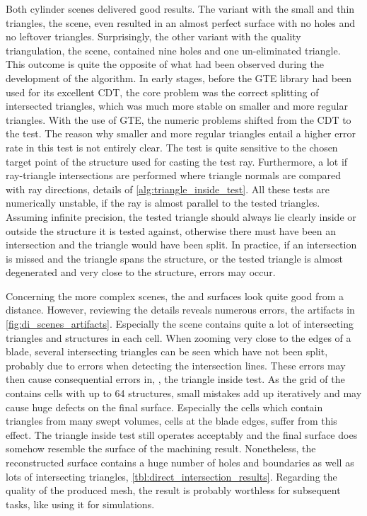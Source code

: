 Both cylinder scenes delivered good results.
The variant with the small and thin triangles, \ie the \cylinders scene, even resulted in an almost perfect surface with no holes and no leftover triangles.
Surprisingly, the other variant with the quality triangulation, \ie the \cylindersd scene, contained nine holes and one un-eliminated triangle.
This outcome is quite the opposite of what had been observed during the development of the algorithm.
In early stages, before the GTE library had been used for its excellent CDT, the core problem was the correct splitting of intersected triangles, which was much more stable on smaller and more regular triangles.
With the use of GTE, the numeric problems shifted from the CDT to the  test.
The reason why smaller and more regular triangles entail a higher error rate in this test is not entirely clear.
The test is quite sensitive to the chosen target point of the structure used for casting the test ray.
Furthermore, a lot if ray-triangle intersections are performed where triangle normals are compared with ray directions, \cf details of \cref{alg:triangle_inside_test}.
All these tests are numerically unstable, if the ray is almost parallel to the tested triangles.
Assuming infinite precision, the tested triangle should always lie clearly inside or outside the structure it is tested against, otherwise there must have been an intersection and the triangle would have been split.
In practice, if an intersection is missed and the triangle spans the structure, or the tested triangle is almost degenerated and very close to the structure, errors may occur.

Concerning the more complex scenes, the \impeller and \turbine surfaces look quite good from a distance.
However, reviewing the details reveals numerous errors, \cf the artifacts in \cref{fig:di_scenes_artifacts}.
Especially the \impeller scene contains quite a lot of intersecting triangles and structures in each cell.
When zooming very close to the edges of a blade, several intersecting triangles can be seen which have not been split, probably due to errors when detecting the intersection lines.
These errors may then cause consequential errors in, \eg, the triangle inside test.
As the grid of the \impeller contains cells with up to 64 structures, small mistakes add up iteratively and may cause huge defects on the final surface.
Especially the cells which contain triangles from many swept volumes, \ie cells at the blade edges, suffer from this effect.
The triangle inside test still operates acceptably and the final surface does somehow resemble the surface of the machining result.
Nonetheless, the reconstructed surface contains a huge number of holes and boundaries as well as lots of intersecting triangles, \cf \cref{tbl:direct_intersection_results}.
Regarding the quality of the produced mesh, the result is probably worthless for subsequent tasks, like using it for simulations.

